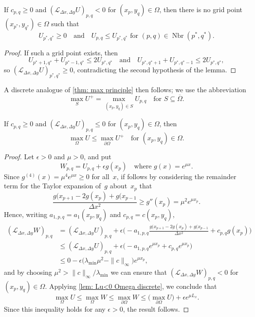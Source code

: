 \begin{lemma}\label{lem: Lu<0 Omega discrete}
If $c_{p,q}\ge0$ and $(\mathcal{L}_{\Delta x,\Delta y}U)_{p,q}<0$ for
$(x_p,y_q)\in\Omega$, then there is no grid point~$(x_{p^*},y_{q^*})\in\Omega$
such that
\[
U_{p^*,q^*}\ge0\quad\text{and}\quad\text{$U_{p,q}\le U_{p^*,q^*}$ 
for $(p,q)\in\operatorname{Nbr}(p^*,q^*)$.}
\]
\end{lemma}
\begin{proof}
If such a grid point exists, then
\[
U_{p^*+1,q^*}+U_{p^*-1,q^*}\le 2U_{p^*,q^*}
\quad\text{and}\quad
U_{p^*,q^*+1}+U_{p^*,q^*-1}\le 2U_{p^*,q^*},
\]
so $(\mathcal{L}_{\Delta x,\Delta y}U)_{p^*,q^*}\ge0$, contradicting the
second hypothesis of the lemma.
\end{proof}

A discrete analogue of \cref{thm: max principle} then follows; we use the
abbreviation
\[
\max_{S}U^+=\max_{(x_p,y_q)\in S}U_{p,q}
	\quad\text{for $S\subseteq\overline{\Omega}.$}
\]

\begin{theorem}
If $c_{p,q}\ge0$ and $(\mathcal{L}_{\Delta x,\Delta y}U)_{p,q}\le0$
for $(x_p,y_q)\in\Omega$, then
\[
\max_\Omega U\le\max_{\partial\Omega}U^+ \quad\text{for $(x_p,y_q)\in\Omega$.}
\]
\end{theorem}
\begin{proof}
Let $\epsilon>0$ and $\mu>0$, and put 
\[
W_{p,q}=U_{p,q}+\epsilon g(x_p)\quad\text{where $g(x)=e^{\mu x}$.}
\]
Since $g^{(4)}(x)=\mu^4e^{\mu x}\ge0$ for all~$x$, if follows by considering
the remainder term for the Taylor expansion of~$g$ about~$x_p$ that
\[
\frac{g(x_{p+1}-2g(x_p)+g(x_{p-1}}{\Delta x^2}\ge g''(x_p)=\mu^2 e^{\mu x_p}.
\]
Hence, writing $a_{1,p,q}=a_1(x_p,y_q)$ and $c_{p,q}=c(x_p,y_q)$,
\begin{align*}
(\mathcal{L}_{\Delta x,\Delta y}W)_{p,q}
	&=(\mathcal{L}_{\Delta x,\Delta y}U)_{p,q}+\epsilon\biggl(-a_{1,p,q}
\frac{g(x_{p+1}-2g(x_p)+g(x_{p-1}}{\Delta x^2}+c_{p,q}g(x_p)\biggr)\\
	&\le(\mathcal{L}_{\Delta x,\Delta y}U)_{p,q}+\epsilon\bigl(-a_{1,p,q}
e^{\mu x_p}+c_{p,q}e^{\mu x_p}\bigr)\\
	&\le0-\epsilon\bigl(\lambda_{\min}\mu^2-\|c\|_\infty\bigr)e^{\mu x_p},
\end{align*}
and by choosing $\mu^2>\|c\|_\infty/\lambda_{\min}$ we can ensure that
$(\mathcal{L}_{\Delta x,\Delta y}W)_{p,q}<0$ for $(x_p,y_q)\in\Omega$.
Applying \cref{lem: Lu<0 Omega discrete}, we conclude that
\[
\max_\Omega U\le\max_\Omega W\le\max_{\partial\Omega}W
	\le\bigl(\max_{\partial\Omega}U\bigr)+\epsilon e^{\mu L_x}.
\]
Since this inequality holds for any $\epsilon>0$, the result follows.
\end{proof}

